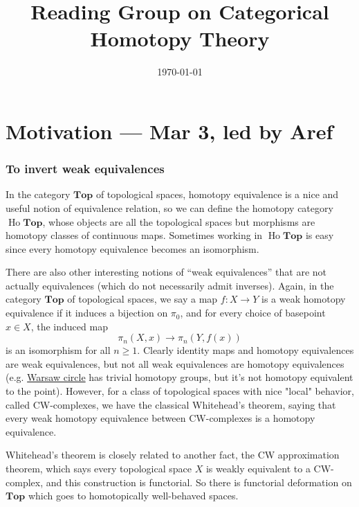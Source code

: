 \documentclass[11pt]{article}
\title{
    Reading Group on Categorical Homotopy Theory
}
\author{}
\date{\today}
\theoremstyle{definition}
\theoremstyle{remark}
\newcommand{\Ho}{\operatorname{Ho}}
\newcommand{\Top}{\mathbf{Top}}
\begin{document}
\maketitle
\tableofcontents
\newpage

\part{Motivation --- Mar 3, led by Aref}

\section{To invert weak equivalences}
In the category $\Top$ of topological spaces,
homotopy equivalence is a nice and useful notion of equivalence relation,
so we can define the homotopy category $\Ho\Top$,
whose objects are all the topological spaces
but morphisms are homotopy classes of continuous maps.
Sometimes working in $\Ho\Top$ is easy since every homotopy equivalence becomes an isomorphism. 

There are also other interesting notions of ``weak equivalences'' that are not actually equivalences (which do not necessarily admit inverses).
Again, in the category $\Top$ of topological spaces, we say a map $f : X \to Y$ is a weak homotopy equivalence if it induces a bijection on $\pi_0$, and for every choice of basepoint $x \in X$, the induced map
\[
\pi_n(X,x) \to \pi_n(Y,f(x))
\]
is an isomorphism for all $n \ge 1$.
Clearly identity maps and homotopy equivalences are weak equivalences, but not all weak equivalences are homotopy equivalences (e.g. \href{https://ncatlab.org/nlab/show/Warsaw+circle}{Warsaw circle} has trivial homotopy groups, but it's not homotopy equivalent to the point). However, for a class of topological spaces with nice "local" behavior, called CW-complexes, we have the classical Whitehead's theorem, saying that 
every weak homotopy equivalence between CW-complexes is a homotopy equivalence. 

Whitehead's theorem is closely related to another fact, the CW approximation theorem, which says every topological space $X$ is weakly equivalent to a CW-complex, and this construction is functorial. So there is functorial deformation on $\Top$ which goes to homotopically well-behaved spaces. 
\end{document}
